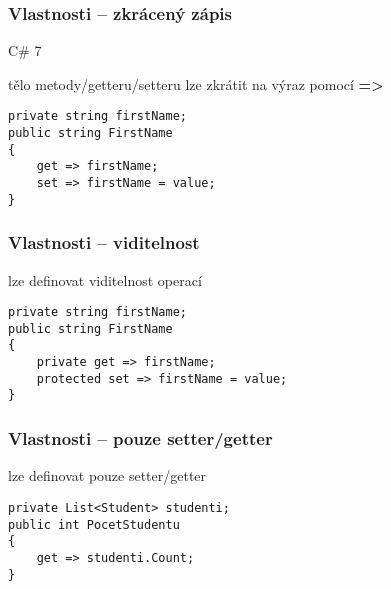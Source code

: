 \begin{frame}[fragile]
\frametitle{Vlastnosti -- zkrácený zápis}
\vfill
\begin{bitemize}{C\# 7}
\item tělo metody/getteru/setteru lze zkrátit na výraz pomocí \textbf{=>}
\end{bitemize}
\vfill
\begin{yesblock}
\begin{lstlisting}
private string firstName;
public string FirstName
{
    get => firstName;
    set => firstName = value;
}
\end{lstlisting}
\end{yesblock}
\vfill
\end{frame}


\begin{frame}[fragile]
\frametitle{Vlastnosti -- viditelnost}
\vfill
\begin{bitemize}{}
\item lze definovat viditelnost operací
\end{bitemize}
\vfill
\begin{yesblock}
\begin{lstlisting}
private string firstName;
public string FirstName
{
    private get => firstName;
    protected set => firstName = value;
}
\end{lstlisting}
\end{yesblock}
\vfill
\end{frame}


\begin{frame}[fragile]
\frametitle{Vlastnosti -- pouze setter/getter}
\vfill
\begin{bitemize}{}
\item lze definovat pouze setter/getter
\end{bitemize}
\vfill
\begin{yesblock}
\begin{lstlisting}
private List<Student> studenti;
public int PocetStudentu
{
    get => studenti.Count;
}
\end{lstlisting}
\end{yesblock}
\vfill
\end{frame}


